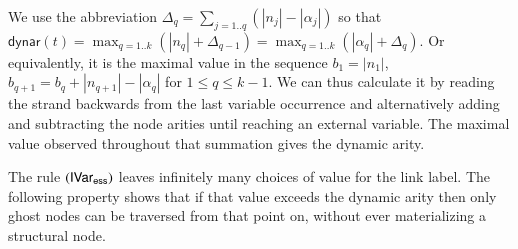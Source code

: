 \documentclass{elsarticle}
\theoremstyle{plain}
\theoremstyle{definition}
\newcommand{\essential}{{\sf ess}}
\newcommand\dynar{\textsf{dynar}} %
\begin{document}
We use the abbreviation $\Delta_q = \sum_{j=1..q} (|n_j|-|\alpha_j|)$ so that
$\dynar(t)
   = \max_{q=1..k} \left( |n_q| + \Delta_{q-1} \right)
   = \max_{q=1..k} \left( |\alpha_q| + \Delta_{q} \right)
$.
Or equivalently, it is the maximal value in the sequence $b_1 = |n_1|$, $b_{q+1} = b_q + |n_{q+1}|-|\alpha_q|$ for $1 \leq q \leq k-1$.
We can thus calculate it by reading the strand backwards from the last variable occurrence and alternatively adding and subtracting the node arities until reaching an external variable. The maximal value observed throughout that summation gives the dynamic arity.


The rule $\rulename{IVar_\essential}$ leaves infinitely many choices of value for the link label. The following property shows that if that value exceeds the dynamic arity then only ghost nodes can be traversed from that point on, without ever materializing a structural node.
\end{document}
